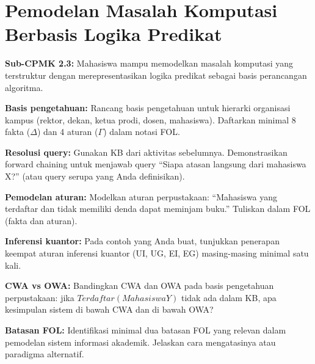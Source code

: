\documentclass[../main]{subfiles}
\begin{document}
\chapter{Pemodelan Masalah Komputasi Berbasis Logika Predikat}

\begin{subcpmk}
  \item \textbf{Sub-CPMK 2.3:} Mahasiswa mampu memodelkan masalah komputasi yang terstruktur dengan merepresentasikan logika predikat sebagai basis perancangan algoritma.
\end{subcpmk}










\begin{aktivitas}
  \item \textbf{Basis pengetahuan:} Rancang basis pengetahuan untuk hierarki organisasi kampus (rektor, dekan, ketua prodi, dosen, mahasiswa). Daftarkan minimal 8 fakta ($\Delta$) dan 4 aturan ($\Gamma$) dalam notasi FOL.
  \item \textbf{Resolusi query:} Gunakan KB dari aktivitas sebelumnya. Demonstrasikan forward chaining untuk menjawab query ``Siapa atasan langsung dari mahasiswa X?'' (atau query serupa yang Anda definisikan).
  \item \textbf{Pemodelan aturan:} Modelkan aturan perpustakaan: ``Mahasiswa yang terdaftar dan tidak memiliki denda dapat meminjam buku.'' Tuliskan dalam FOL (fakta dan aturan).
  \item \textbf{Inferensi kuantor:} Pada contoh yang Anda buat, tunjukkan penerapan keempat aturan inferensi kuantor (UI, UG, EI, EG) masing-masing minimal satu kali.
  \item \textbf{CWA vs OWA:} Bandingkan CWA dan OWA pada basis pengetahuan perpustakaan: jika $Terdaftar(MahasiswaY)$ tidak ada dalam KB, apa kesimpulan sistem di bawah CWA dan di bawah OWA?
  \item \textbf{Batasan FOL:} Identifikasi minimal dua batasan FOL yang relevan dalam pemodelan sistem informasi akademik. Jelaskan cara mengatasinya atau paradigma alternatif.
\end{aktivitas}
\end{document}
